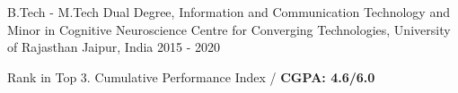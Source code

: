 


\begin{cventries}


\cventry
{B.Tech - M.Tech Dual Degree, Information and Communication Technology and Minor in Cognitive Neuroscience} %
{Centre for Converging Technologies, University of Rajasthan} %
{Jaipur, India} %
{2015 - 2020} %
{%
\begin{cvitems}
\item {Rank in Top 3. Cumulative Performance Index /
    \textbf{CGPA: 4.6/6.0}}
\end{cvitems}
}

\end{cventries}


